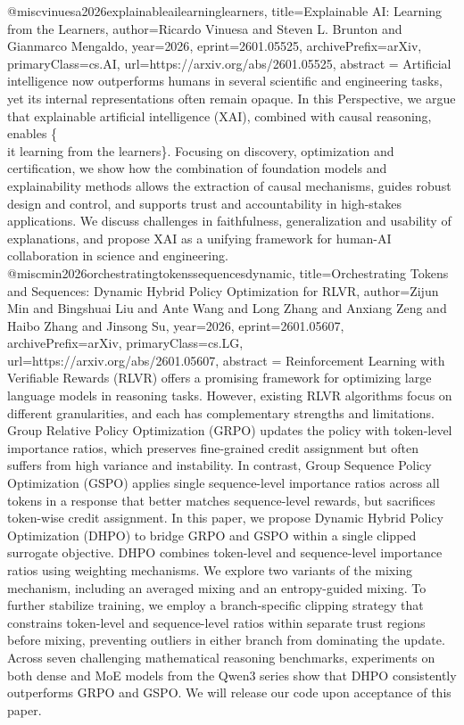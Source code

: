 {}@misc{vinuesa2026explainableailearninglearners,
      title={Explainable AI: Learning from the Learners}, 
      author={Ricardo Vinuesa and Steven L. Brunton and Gianmarco Mengaldo},
      year={2026},
      eprint={2601.05525},
      archivePrefix={arXiv},
      primaryClass={cs.AI},
      url={https://arxiv.org/abs/2601.05525},
      abstract = {Artificial intelligence now outperforms humans in several scientific and engineering tasks, yet its internal representations often remain opaque. In this Perspective, we argue that explainable artificial intelligence (XAI), combined with causal reasoning, enables \{\\it learning from the learners\}. Focusing on discovery, optimization and certification, we show how the combination of foundation models and explainability methods allows the extraction of causal mechanisms, guides robust design and control, and supports trust and accountability in high-stakes applications. We discuss challenges in faithfulness, generalization and usability of explanations, and propose XAI as a unifying framework for human-AI collaboration in science and engineering.}
}@misc{min2026orchestratingtokenssequencesdynamic,
      title={Orchestrating Tokens and Sequences: Dynamic Hybrid Policy Optimization for RLVR}, 
      author={Zijun Min and Bingshuai Liu and Ante Wang and Long Zhang and Anxiang Zeng and Haibo Zhang and Jinsong Su},
      year={2026},
      eprint={2601.05607},
      archivePrefix={arXiv},
      primaryClass={cs.LG},
      url={https://arxiv.org/abs/2601.05607},
      abstract = {Reinforcement Learning with Verifiable Rewards (RLVR) offers a promising framework for optimizing large language models in reasoning tasks. However, existing RLVR algorithms focus on different granularities, and each has complementary strengths and limitations. Group Relative Policy Optimization (GRPO) updates the policy with token-level importance ratios, which preserves fine-grained credit assignment but often suffers from high variance and instability. In contrast, Group Sequence Policy Optimization (GSPO) applies single sequence-level importance ratios across all tokens in a response that better matches sequence-level rewards, but sacrifices token-wise credit assignment. In this paper, we propose Dynamic Hybrid Policy Optimization (DHPO) to bridge GRPO and GSPO within a single clipped surrogate objective. DHPO combines token-level and sequence-level importance ratios using weighting mechanisms. We explore two variants of the mixing mechanism, including an averaged mixing and an entropy-guided mixing. To further stabilize training, we employ a branch-specific clipping strategy that constrains token-level and sequence-level ratios within separate trust regions before mixing, preventing outliers in either branch from dominating the update. Across seven challenging mathematical reasoning benchmarks, experiments on both dense and MoE models from the Qwen3 series show that DHPO consistently outperforms GRPO and GSPO. We will release our code upon acceptance of this paper.}
}
